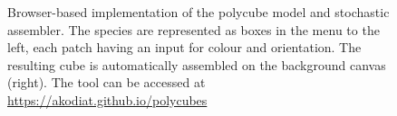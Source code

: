 \begin{figure}[h]
    \centering
    \caption{Browser-based implementation of the polycube model and stochastic assembler. The species are represented as boxes in the menu to the left, each patch having an input for colour and orientation. The resulting cube is automatically assembled on the background canvas (right). The tool can be accessed at \url{https://akodiat.github.io/polycubes}}
    \label{fig:polycubeJS}
\end{figure}





